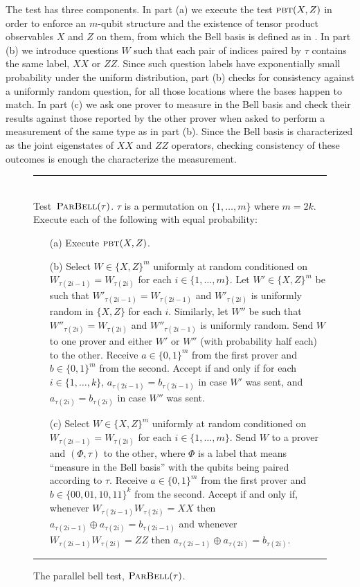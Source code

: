 \documentclass{toc}
\newcommand{\pbt}{\textsc{pbt}}
\newcommand{\pbellt}{\textsc{ParBell}}
\begin{document}
The test has three components. In part (a) we execute the test $\pbt(X,Z)$ in order to enforce an $m$-qubit structure and the existence of tensor product observables $X$ and $Z$ on them, from which the Bell basis is defined as in . In part (b) we introduce questions $W$ such that each pair of indices paired by $\tau$ contains the same label, $XX$ or $ZZ$. Since such question labels have exponentially small probability under the uniform distribution, part (b) checks for consistency against a uniformly random question, for all those locations where the bases happen to match. 
In part (c) we ask one prover to measure in the Bell basis and check their results against those reported by the other prover when asked to perform a measurement of the same type as in part (b). Since the Bell basis is characterized as the joint eigenstates of $XX$ and $ZZ$ operators, checking consistency of these outcomes is enough the characterize the measurement. 


\begin{figure}[H]
\rule[1ex]{\textwidth}{0.5pt}\\
\justifying
Test~$\pbellt(\tau)$. $\tau$ is a permutation on $\{1,\ldots,m\}$ where  $m=2k$. \\
Execute each of the following with equal probability: 
\begin{enumerate}
\item[(a)] Execute $\pbt(X,Z)$.
\item[(b)] Select $W\in \{X,Z\}^m$ uniformly at random conditioned on $W_{\tau(2i-1)}=W_{\tau(2i)}$ for each $i\in\{1,\ldots,m\}$. Let $W' \in \{X,Z\}^m$ be such that $W'_{\tau(2i-1)}=W_{\tau(2i-1)}$ and $W'_{\tau(2i)}$ is uniformly random in $\{X,Z\}$ for each $i$. Similarly, let $W''$ be such that $W''_{\tau(2i)}=W_{\tau(2i)}$ and $W''_{\tau(2i-1)}$ is uniformly random. Send $W$ to one prover and either $W'$ or $W''$ (with probability half each) to the other. Receive $a\in\{0,1\}^m$ from the first prover and $b\in\{0,1\}^m$ from the second. Accept if and only if for each $i\in\{1,\ldots,k\}$, $a_{\tau(2i-1)}=b_{\tau(2i-1)}$ in case $W'$ was sent, and $a_{\tau(2i)}=b_{\tau(2i)}$ in case $W''$ was sent.
\item[(c)] Select $W\in \{X,Z\}^m$ uniformly at random conditioned on $W_{\tau(2i-1)}=W_{\tau(2i)}$ for each $i\in\{1,\ldots,m\}$. Send $W$ to a prover and $(\Phi,\tau)$ to the other, where $\Phi$ is a label that means ``measure in the Bell basis'' with the qubits being paired according to $\tau$. Receive $a\in\{0,1\}^m$ from the first prover and $b\in\{00,01,10,11\}^k$ from the second. Accept if and only if, whenever $W_{\tau(2i-1)}W_{\tau(2i)}=XX$ then $a_{\tau(2i-1)}\oplus a_{\tau(2i)}=b_{\tau(2i-1)}$ and whenever $W_{\tau(2i-1)}W_{\tau(2i)}=ZZ$ then $a_{\tau(2i-1)}\oplus a_{\tau(2i)}=b_{\tau(2i)}$.
\end{enumerate}
\rule[2ex]{\textwidth}{0.5pt}\vspace{-.5cm}
\caption{The parallel bell test, $\pbellt(\tau)$.}
\label{fig:pbell-test}
\end{figure}
\end{document}
